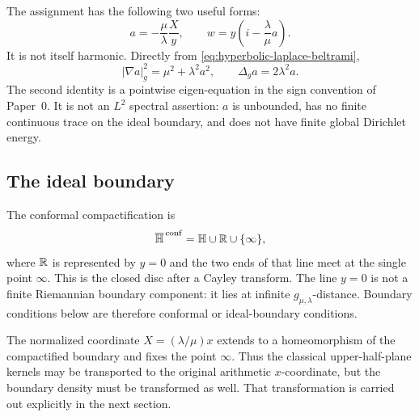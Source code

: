 The assignment has the following two useful forms:
\begin{equation}\label{eq:hyperbolic-assignment-w}
 a=-\frac{\mu}{\lambda}\frac{X}{y},
 \qquad
 w=y\left(i-\frac{\lambda}{\mu}a\right).
\end{equation}
It is not itself harmonic.  Directly from
\eqref{eq:hyperbolic-laplace-beltrami},
\begin{equation}\label{eq:hyperbolic-assignment-eigen-equation-II}
 |\nabla a|_g^2=\mu^2+\lambda^2a^2,
 \qquad
 \Delta_ga=2\lambda^2a.
\end{equation}
The second identity is a pointwise eigen-equation in the sign convention of
Paper~0.  It is not an $L^2$ spectral assertion: $a$ is unbounded, has no
finite continuous trace on the ideal boundary, and does not have finite global
Dirichlet energy.

\subsection{The ideal boundary}

The conformal compactification is
\[
 \overline{\mathbb{H}}^{\,\mathrm{conf}}
 =\mathbb{H}\cup\mathbb{R}\cup\{\infty\},
\]
where $\mathbb{R}$ is represented by $y=0$ and the two ends of that line meet at the
single point $\infty$.  This is the closed disc after a Cayley transform.  The
line $y=0$ is not a finite Riemannian boundary component: it lies at infinite
$g_{\mu,\lambda}$-distance.  Boundary conditions below are therefore
conformal or ideal-boundary conditions.

The normalized coordinate $X=(\lambda/\mu)x$ extends to a homeomorphism of
the compactified boundary and fixes the point $\infty$.  Thus the classical
upper-half-plane kernels may be transported to the original arithmetic
$x$-coordinate, but the boundary density must be transformed as well.  That
transformation is carried out explicitly in the next section.

